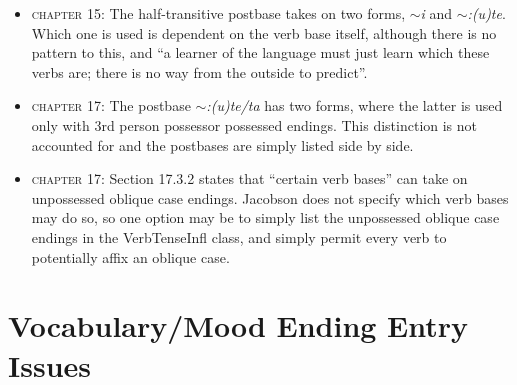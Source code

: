 \documentclass{article}
\begin{document}
\begin{itemize}
\item \textsc{chapter 15}: The half-transitive postbase takes on two forms, \textit{$\sim$i} and \textit{$\sim$:(u)te}.
%
Which one is used is dependent on the verb base itself, although there is no pattern to this, and ``a learner of the language must just learn which these verbs are; there is no way from the outside to predict''.

\item \textsc{chapter 17}: The postbase \textit{$\sim$:(u)te/ta} has two forms, where the latter is used only with 3rd person possessor possessed endings.
%
This distinction is not accounted for and the postbases are simply listed side by side.

\item \textsc{chapter 17}: Section 17.3.2 states that ``certain verb bases'' can take on unpossessed oblique case endings.
%
Jacobson does not specify which verb bases may do so, so one option may be to simply list the unpossessed oblique case endings in the VerbTenseInfl class, and simply permit every verb to potentially affix an oblique case.

\end{itemize}


\section{Vocabulary/Mood Ending Entry Issues}
\end{document}
